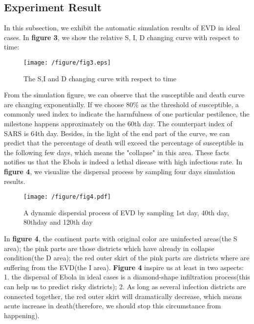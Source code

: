 \subsection{Experiment Result}
In this subsection, we exhibit the automatic simulation results of EVD in ideal cases. In \textbf{figure 3}, we show the relative S, I, D changing curve with respect to time:

\begin{figure}[htbp]
\centering
\texttt{[image: /figure/fig3.eps]}
\caption{The S,I and D changing curve with respect to time}\label{fig:3}
\end{figure}

From the simulation figure, we can observe that the susceptible and death curve are changing exponentially. If we choose 80\% as the threshold of susceptible, a commonly used index to indicate the harmfulness of one particular pestilence, the milestone happens approximately on the 60th day. The counterpart index of SARS is 64th day\cite{small2006super}. Besides, in the light of the end part of the curve, we can predict that the percentage of death will exceed the percentage of susceptible in the following few days, which means the  "collapse" in this area. These facts notifies us that the Ebola is indeed a lethal disease with high infectious rate.
In \textbf{figure 4}, we visualize the dispersal process by sampling four days simulation results.
\begin{figure}[htbp]
\centering
\texttt{[image: /figure/fig4.pdf]}
\caption{A dynamic dispersial process of EVD by sampling 1st day, 40th day, 80thday and 120th day}\label{fig:4}
\end{figure}
In \textbf{figure 4}, the continent parts with original color are uninfected areas(the S area); the pink parts are those districts which have already in collapse condition(the D area); the red outer skirt of the pink parts are districts where are suffering from the EVD(the I area). \textbf{Figure 4} inspire us at least in two aspects: 1. the dispersal of Ebola in ideal cases is a diamond-shape infiltration process(this can help us to predict risky districts); 2. As long as several infection districts are connected together, the red outer skirt will dramatically decrease, which means acute increase in death(therefore, we should stop this circumstance from happening).
